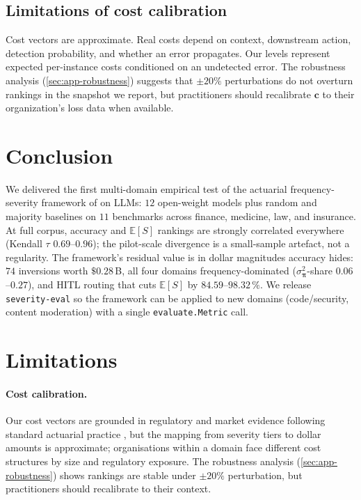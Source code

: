 \documentclass[11pt]{article}
\newcommand{\ES}{\mathbb{E}[S]}
\newcommand{\seveval}{\texttt{severity-eval}}
\newcommand{\bpi}{\boldsymbol{\pi}}
\begin{document}
\subsection{Limitations of cost calibration}

Cost vectors are approximate. Real costs depend on context,
downstream action, detection probability, and whether an error
propagates. Our levels represent expected per-instance costs
conditioned on an undetected error. The robustness analysis (\autoref{sec:app-robustness})
suggests that $\pm 20\%$ perturbations do not overturn rankings in
the snapshot we report, but practitioners should recalibrate
$\mathbf{c}$ to their organization's loss data when available.


\section{Conclusion}
\label{sec:conclusion}

We delivered the first multi-domain empirical test of the
actuarial frequency-severity framework of
\citet{beauchemin2026position} on LLMs: $12$ open-weight models
plus random and majority baselines on $11$ benchmarks across
finance, medicine, law, and insurance. At full corpus, accuracy
and $\ES$ rankings are strongly correlated everywhere (Kendall
$\tau$ $0.69$--$0.96$); the pilot-scale divergence is a
small-sample artefact, not a regularity. The framework's residual
value is in dollar magnitudes accuracy hides: $74$ inversions
worth $\$0.28$\,B, all four domains frequency-dominated
($\sigma^2_{\bpi}$-share $0.06$--$0.27$), and HITL routing that
cuts $\ES$ by $84.59$--$98.32\,\%$. We release \seveval{} so the
framework can be applied to new domains (code/security, content
moderation) with a single \texttt{evaluate.Metric} call.


\section*{Limitations}
\label{sec:limitations}

\paragraph{Cost calibration.}
Our cost vectors are grounded in regulatory and market evidence
following standard actuarial practice
\citep{klugman2012loss,basel2006}, but the mapping from severity
tiers to dollar amounts is approximate; organisations within a
domain face different cost structures by size and regulatory
exposure. The robustness analysis (\autoref{sec:app-robustness})
shows rankings are stable under $\pm 20\%$ perturbation, but
practitioners should recalibrate to their context.
\end{document}
